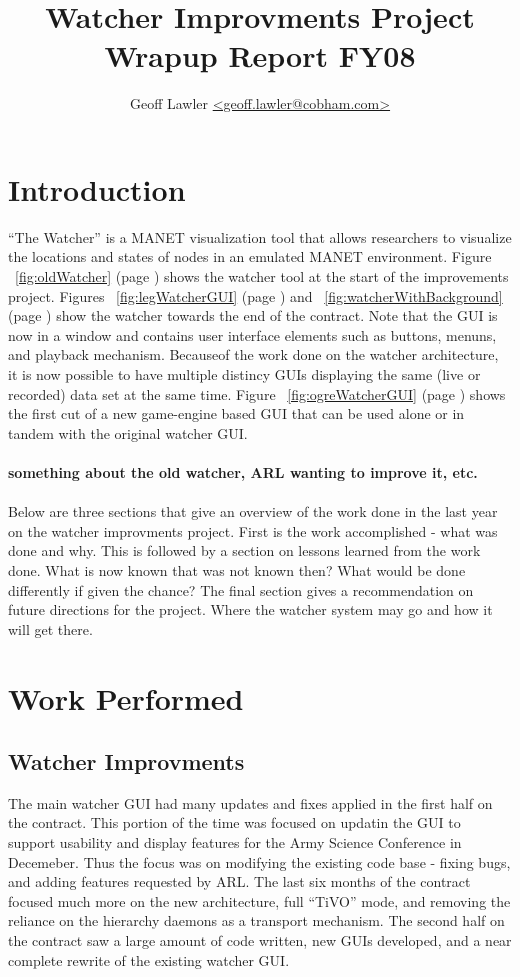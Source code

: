 \documentclass{report}
\author{Geoff Lawler \url{<geoff.lawler@cobham.com>}}
\title{{\bf Watcher Improvments Project}\\Wrapup Report FY08}
\begin{document}
\maketitle

\renewcommand*\thesection{\arabic{section}}

\section{Introduction}

``The Watcher'' is a MANET visualization tool that allows researchers to visualize the locations and states of nodes in an emulated MANET environment. 
Figure ~\ref{fig:oldWatcher} (page \pageref{fig:oldWatcher}) shows the watcher tool at the start of the improvements project. Figures ~\ref{fig:legWatcherGUI} (page \pageref{fig:legWatcherGUI}) and ~\ref{fig:watcherWithBackground}
(page \pageref{fig:watcherWithBackground}) show the watcher towards the end of the contract. Note that the GUI is now in a window and contains user interface elements such as buttons, menuns, and playback
mechanism. Becauseof the work done on the watcher architecture, it is now possible to have multiple distincy GUIs displaying the same (live or recorded) data 
set at the same time. Figure ~\ref{fig:ogreWatcherGUI} (page \pageref{fig:ogreWatcherGUI}) shows the first cut of a new game-engine based GUI that can be used alone or in tandem with the original watcher GUI. 
\\\\
{\bf something about the old watcher, ARL wanting to improve it, etc. }
\\\\
Below are three sections that give an overview of the work done in the last year on the watcher improvments project. First
is the work accomplished - what was done and why. This is followed by a section on lessons learned from the work done. What is now known 
that was not known then? What would be done differently if given the chance? The final section gives a recommendation on future directions
for the project. Where the watcher system may go and how it will get there. 

\section{Work Performed}

\subsection{Watcher Improvments}
The main watcher GUI had many updates and fixes applied in the first half on the contract. This portion of the time was focused on updatin the GUI to 
support usability and display features for the Army Science Conference in Decemeber. Thus the focus was on modifying the existing code base - fixing bugs, 
and adding features requested by ARL. The last six months of the contract focused much more on the new architecture, full ``TiVO'' mode, and removing 
the reliance on the hierarchy daemons as a transport mechanism. The second half on the contract saw a large amount of code written, new GUIs developed, and 
a near complete rewrite of the existing watcher GUI. 
\end{document}
